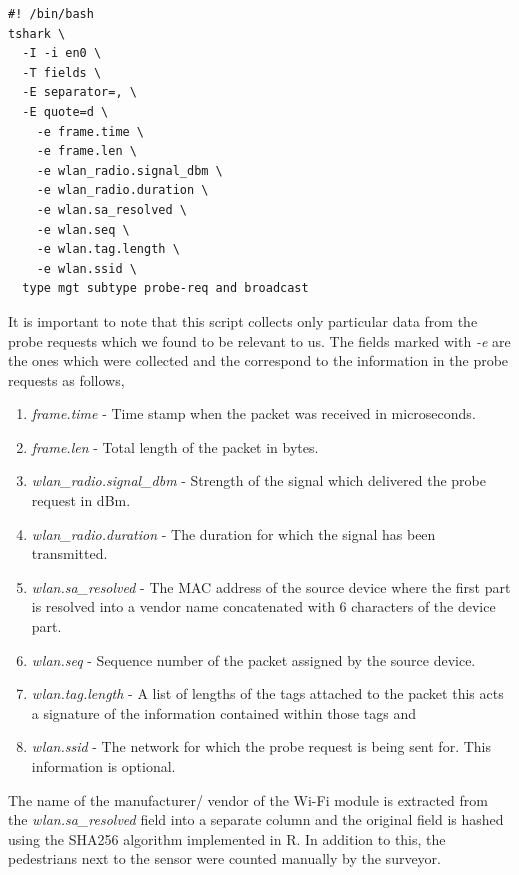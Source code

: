 \begin{verbatim}
#! /bin/bash
tshark \
  -I -i en0 \
  -T fields \
  -E separator=, \
  -E quote=d \
    -e frame.time \
    -e frame.len \
    -e wlan_radio.signal_dbm \
    -e wlan_radio.duration \
    -e wlan.sa_resolved \
    -e wlan.seq \
    -e wlan.tag.length \
    -e wlan.ssid \
  type mgt subtype probe-req and broadcast
\end{verbatim}

It is important to note that this script collects only particular data from the probe requests which we found to be relevant to us. 
The fields marked with \textit{-e} are the ones which were collected and the correspond to the information in the probe requests as follows,

\begin{enumerate}[rightmargin = 2em, leftmargin = 2em]
  \itemsep-0.25em
  \item \textit{frame.time} - Time stamp when the packet was received in microseconds.
  \item \textit{frame.len} - Total length of the packet in bytes.
  \item \textit{wlan\_radio.signal\_dbm} - Strength of the signal which delivered the probe request in dBm.
  \item \textit{wlan\_radio.duration} - The duration for which the signal has been transmitted.
  \item \textit{wlan.sa\_resolved} - The MAC address of the source device where the first part is resolved into a vendor name concatenated with 6 characters of the device part.
  \item \textit{wlan.seq} - Sequence number of the packet assigned by the source device.
  \item \textit{wlan.tag.length} - A list of lengths of the tags attached to the packet this acts a signature of the information contained within those tags and
  \item \textit{wlan.ssid} - The network for which the probe request is being sent for. This information is optional.
\end{enumerate}

The name of the manufacturer/ vendor of the Wi-Fi module  is extracted from the \textit{wlan.sa\_resolved} field into a separate column and the original field is hashed using the SHA256 algorithm implemented in R.
In addition to this, the pedestrians next to the sensor were counted manually by the surveyor.

